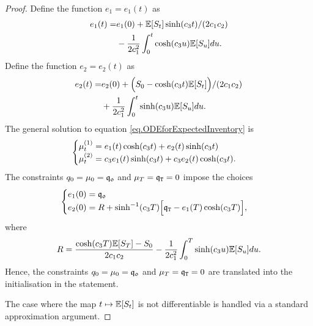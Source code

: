 \documentclass[10pt,a4paper]{article}
\begin{document}
\begin{proof}
		Define the function $e_1=e_1(t)$ as 
		\begin{equation*}
		\begin{split}
		e_1(t) = & e_1(0) + \mathbb{{E}}[S_t]\sinh(c_{3} t)/ (2c_{1} c_{2}) \\
		& - \frac{1}{2c_{1}^{2} } \int_{0}^{t} \cosh(c_{3} u) \mathbb{{E}}[S_u] du.
		\end{split}
		\end{equation*}
		Define the function $e_2=e_2(t)$ as 
		\begin{equation*}
		\begin{split}
		e_2(t) = & e_2(0) +  \Big(S_0 -\cosh(c_{3} t)\mathbb{{E}}[S_t]\Big)/ (2c_{1} c_{2}) \\
		& + \frac{1}{2c_{1}^{2} } \int_{0}^{t} \sinh(c_{3} u) \mathbb{{E}}[S_u] du.
		\end{split}
		\end{equation*}
		The general solution to equation \eqref{eq.ODEforExpectedInventory} is
		\begin{equation*}
		\begin{cases}
		\mu^{(1)}_t = e_1(t) \cosh(c_{3} t ) + e_2(t)\sinh(c_{3} t) \\
		\mu^{(2)}_t = c_{3} e_1(t) \sinh(c_{3} t ) + c_{3} e_2(t)\cosh(c_{3} t).
		\end{cases}
		\end{equation*}
		 The constraints $q_0 = \mu_0 = \mathfrak{q_0}$ and $\mu_T  = \mathfrak{q}_{\mathtt{T} } = 0$ impose the choices
		 \begin{equation*}
		 \begin{cases}
		 e_1(0)=\mathfrak{q_0} \\
		 e_2(0)=R+\sinh^{-1} (c_{3} T)\Big[\mathfrak{q}_{\mathtt{T} } - e_1(T)\cosh(c_{3} T)\Big],
		 \end{cases}
		 \end{equation*}
		 where 
		 \begin{equation*}
		 R= \frac{\cosh(c_{3} T)\mathbb{{E}}[S_T] - S_0}{2c_{1}c_{2}}
		 -\frac{1}{2c_{1}^{2}}\int_{0}^{T} \sinh(c_{3} u)\mathbb{{E}}[S_u]du.
		 \end{equation*}
		 Hence, the constraints $q_0 = \mu_0 = \mathfrak{q_0}$ and $\mu_T  = \mathfrak{q}_{\mathtt{T} } = 0$ are translated into the initialisation in the statement. 
		 
		 The case where the map $t\mapsto \mathbb{{E}}[S_t]$ is not differentiable is handled via a standard approximation argument.
	\end{proof}
	
\end{document}
